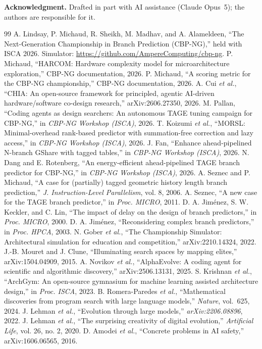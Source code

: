 \documentclass[conference]{IEEEtran}
\begin{document}
\noindent\textbf{Acknowledgment.} Drafted in part with AI assistance (Claude
Opus~5); the authors are responsible for it.

\balance
\begin{thebibliography}{99}
 A. Lindsay, P. Michaud, R. Sheikh, M. Madhav, and A. Alameldeen,
``The Next-Generation Championship in Branch Prediction (CBP-NG),'' held with
ISCA 2026. Simulator: \url{https://github.com/AmpereComputing/cbp-ng}.
 P. Michaud, ``HARCOM: Hardware complexity model for
microarchitecture exploration,'' CBP-NG documentation, 2026.
 P. Michaud, ``A scoring metric for the CBP-NG
championship,'' CBP-NG documentation, 2026.
 A. Cui \emph{et al.}, ``CHIA: An open-source framework for
principled, agentic AI-driven hardware/software co-design research,''
arXiv:2606.27350, 2026.
 M. Pallan, ``Coding agents as design searchers: An autonomous
TAGE tuning campaign for CBP-NG,'' in \emph{CBP-NG Workshop (ISCA)}, 2026.
 T. Koizumi \emph{et al.}, ``MORSL: Minimal-overhead
rank-based predictor with summation-free correction and lazy access,'' in
\emph{CBP-NG Workshop (ISCA)}, 2026.
 J. Fan, ``Enhance ahead-pipelined N-branch GShare with tagged
tables,'' in \emph{CBP-NG Workshop (ISCA)}, 2026.
 N. Dang and E. Rotenberg, ``An energy-efficient ahead-pipelined
TAGE branch predictor for CBP-NG,'' in \emph{CBP-NG Workshop (ISCA)}, 2026.
 A. Seznec and P. Michaud, ``A case for (partially)
tagged geometric history length branch prediction,'' \emph{J. Instruction-Level
Parallelism}, vol. 8, 2006.
 A. Seznec, ``A new case for the TAGE branch
predictor,'' in \emph{Proc. MICRO}, 2011.
 D. A. Jim\'enez, S. W. Keckler, and C. Lin, ``The
impact of delay on the design of branch predictors,'' in \emph{Proc. MICRO},
2000.
 D. A. Jim\'enez, ``Reconsidering complex
branch predictors,'' in \emph{Proc. HPCA}, 2003.
 N. Gober \emph{et al.}, ``The Championship Simulator:
Architectural simulation for education and competition,'' arXiv:2210.14324, 2022.
 J.-B. Mouret and J. Clune, ``Illuminating
search spaces by mapping elites,'' arXiv:1504.04909, 2015.
 A. Novikov \emph{et al.}, ``AlphaEvolve: A coding agent
for scientific and algorithmic discovery,'' arXiv:2506.13131, 2025.
 S. Krishnan \emph{et al.}, ``ArchGym: An open-source
gymnasium for machine learning assisted architecture design,'' in \emph{Proc.
ISCA}, 2023.
 B. Romera-Paredes \emph{et al.}, ``Mathematical discoveries
from program search with large language models,'' \emph{Nature}, vol.\ 625,
2024.
 J. Lehman \emph{et al.}, ``Evolution through large models,''
\emph{arXiv:2206.08896}, 2022.
 J. Lehman \emph{et al.}, ``The surprising
creativity of digital evolution,'' \emph{Artificial Life}, vol. 26, no. 2, 2020.
 D. Amodei \emph{et al.}, ``Concrete problems in
AI safety,'' arXiv:1606.06565, 2016.
\end{thebibliography}
\end{document}
